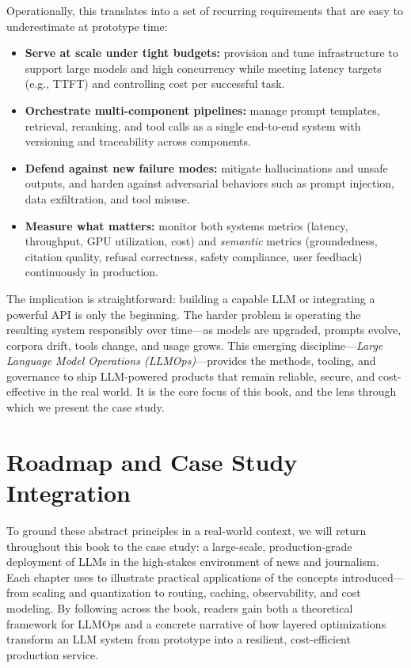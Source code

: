 Operationally, this translates into a set of recurring requirements that are easy to underestimate at prototype time:
\begin{itemize}
    \item \textbf{Serve at scale under tight budgets:} provision and tune infrastructure to support large models and high concurrency while meeting latency targets (e.g., TTFT) and controlling cost per successful task.
    \item \textbf{Orchestrate multi-component pipelines:} manage prompt templates, retrieval, reranking, and tool calls as a single end-to-end system with versioning and traceability across components.
    \item \textbf{Defend against new failure modes:} mitigate hallucinations and unsafe outputs, and harden against adversarial behaviors such as prompt injection, data exfiltration, and tool misuse.
    \item \textbf{Measure what matters:} monitor both systems metrics (latency, throughput, GPU utilization, cost) and \emph{semantic} metrics (groundedness, citation quality, refusal correctness, safety compliance, user feedback) continuously in production.
\end{itemize}

The implication is straightforward: building a capable LLM or integrating a powerful API is only the beginning. The harder problem is operating the resulting system responsibly over time---as models are upgraded, prompts evolve, corpora drift, tools change, and usage grows. This emerging discipline---\emph{Large Language Model Operations (LLMOps)}---provides the methods, tooling, and governance to ship LLM-powered products that remain reliable, secure, and cost-effective in the real world. It is the core focus of this book, and the lens through which we present the \ishtar{} case study.

\section*{Roadmap and Case Study Integration}
To ground these abstract principles in a real-world context, we will return throughout this book to the \ishtar{} case study: a large-scale, production-grade deployment of LLMs in the high-stakes environment of news and journalism. Each chapter uses \ishtar{} to illustrate practical applications of the concepts introduced---from scaling and quantization to routing, caching, observability, and cost modeling. By following \ishtar{} across the book, readers gain both a theoretical framework for LLMOps and a concrete narrative of how layered optimizations transform an LLM system from prototype into a resilient, cost-efficient production service.

